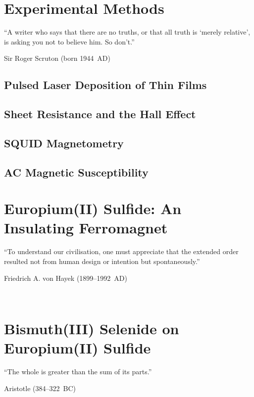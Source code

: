 ﻿\documentclass{report}
\begin{document}
\chapter{Experimental Methods}\label{ch:methods}%
\begin{refsection}   
\epigraph{``A writer who says that there are no truths, or that all truth is `merely relative', is asking you not to believe him. So don't.''}{Sir Roger Scruton (born 1944~AD)}
    \section{Pulsed Laser Deposition of Thin Films}\label{sec:pld}
		
    \section{Sheet Resistance and the Hall Effect}
		
    \section{SQUID Magnetometry}\label{sec:squid}
        
    \section{AC Magnetic Susceptibility}\label{sec:acm}
        
    \printbibliography[heading=subbibintoc, title=References for Chapter~\thechapter]
\end{refsection} 


\chapter{Europium(II) Sulfide: An Insulating Ferromagnet}\label{ch:EuS}
\begin{refsection}
\epigraph{``To understand our civilisation, one must appreciate that the extended order resulted not from human design or intention but spontaneously.''}{Friedrich A. von Hayek (1899--1992~AD)}~\\
    
    \printbibliography[heading=subbibintoc, title=References for Chapter~\thechapter]
\end{refsection} 

\chapter{Bismuth(III) Selenide on Europium(II) Sulfide}\label{ch:bilayer2014}
\begin{refsection} 
\epigraph{``The whole is greater than the sum of its parts.''}{Aristotle (384--322~BC)}~\\
    
    \printbibliography[heading=subbibintoc, title=References for Chapter~\thechapter]
\end{refsection} 
\end{document}
